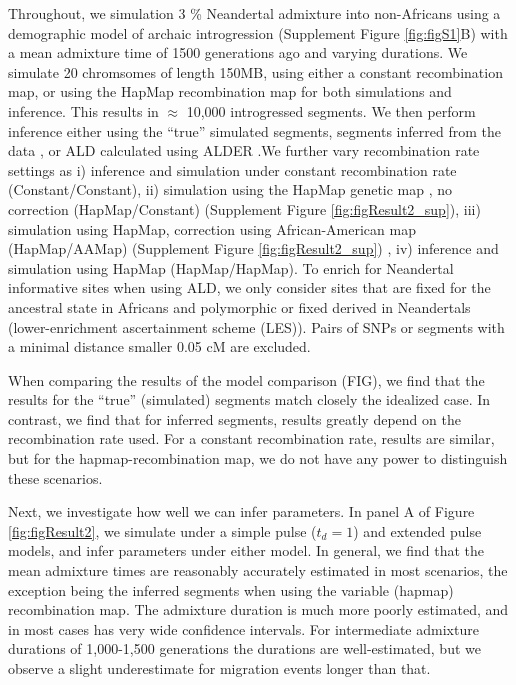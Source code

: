 \documentclass[11pt]{article}
\begin{document}
Throughout, we simulation 3 \% Neandertal admixture into non-Africans using a demographic model of archaic introgression (Supplement Figure \ref{fig:figS1}B) with a mean admixture time of 1500 generations ago and varying durations.  We simulate 20 chromsomes of length 150MB, using either a constant recombination map, or using the HapMap recombination map \cite{HapMapConsortium_second_2007} for both simulations and inference. This results in $\approx$ 10,000 introgressed segments. We then perform inference either using the ``true'' simulated segments, segments inferred from the data \citep{skov_detecting_2018}, or ALD calculated using ALDER \citep{loh_inferring_2013}.We further vary recombination rate settings as i) inference and simulation under constant recombination rate (Constant/Constant), ii) simulation using the HapMap genetic map \citep{HapMapConsortium_second_2007}, no correction (HapMap/Constant) (Supplement Figure \ref{fig:figResult2_sup}), iii) simulation using HapMap, correction using African-American map (HapMap/AAMap) (Supplement Figure \ref{fig:figResult2_sup}) \citep{hinch_landscape_2011}, iv) inference and simulation using HapMap (HapMap/HapMap). To enrich for Neandertal informative sites when using ALD, we only consider sites that are fixed for the ancestral state in Africans and polymorphic or fixed derived in Neandertals (lower-enrichment ascertainment scheme (LES)). Pairs of SNPs or segments with a minimal distance smaller 0.05 cM are excluded.

When comparing the results of the model comparison (FIG), we find that the results for the ``true'' (simulated) segments match closely the idealized case. In contrast, we find that for inferred segments, results greatly depend on the recombination rate used. For a constant recombination rate, results are similar, but for the hapmap-recombination map, we do not have any power to distinguish these scenarios. 


Next, we investigate how well we can infer parameters. In panel A of Figure \ref{fig:figResult2}, we simulate under a simple pulse ($t_d=1$) and extended pulse models, and infer parameters under either model. In general, we find that the mean admixture times are reasonably accurately estimated in most scenarios, the exception being the inferred segments when using the variable (hapmap) recombination map. The admixture duration is much more poorly estimated, and in most cases has very wide confidence intervals. For intermediate admixture durations of 1,000-1,500 generations the durations are well-estimated, but we observe a slight underestimate for migration events longer than that.
 
\end{document}

